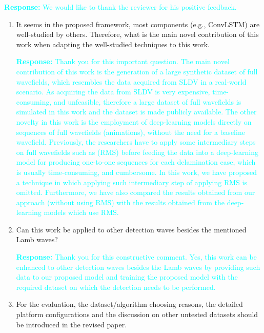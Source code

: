 \documentclass[11pt,a2paper]{report}
\begin{document}
	\textcolor{Cyan}{
	\newline\textbf{Response:}
	We would like to thank the reviewer for his positive feedback.
    }
	\begin{enumerate}
		\item It seems in the proposed framework, most components (e.g., 
		ConvLSTM) are well-studied by others.
		Therefore, what is the main novel contribution of this work when 
		adapting the well-studied techniques to this work.
		
		\textcolor{Cyan}{
			\textbf{Response:}
		Thank you for this important question.
		The main novel contribution of this work is the generation of a large 
		synthetic dataset of full wavefields, which resembles the data acquired 
		from SLDV in a real-world scenario. 
		As acquiring the data from SLDV is very expensive, time-consuming, and 
		unfeasible, therefore a large dataset of full wavefields is simulated 
		in this work and the dataset is made publicly available. 
		\newline The other novelty in this work is the employment of 
		deep-learning models directly on sequences of full wavefields 
		(animations), without the need for a baseline wavefield.
		Previously, the researchers have to apply some intermediary steps on 
		full wavefields such as (RMS) before feeding the data into a 
		deep-learning model for producing one-to-one sequences for each 
		delamination case, which is usually time-consuming, and cumbersome.
		In this work, we have proposed a technique in which applying such 
		intermediary step of applying RMS is omitted.
		Furthermore, we have also compared the results obtained from our 
		approach (without using RMS) with the results obtained from the 
		deep-learning models which use RMS.}
		
		\item Can this work be applied to other detection waves besides the 
		mentioned Lamb waves?
		
		\textcolor{Cyan}{
			\textbf{Response:}
			Thank you for this constructive comment.
			Yes, this work can be enhanced to other detection waves besides the 
			Lamb waves by providing such data to our proposed model and 
			training the proposed model with the required dataset on which the 
			detection needs to be performed.
		}
		\item For the evaluation, the dataset/algorithm choosing reasons, the 
		detailed platform configurations and the discussion on other untested 
		datasets should be introduced in the revised paper.
		

\end{enumerate}
\end{document}
